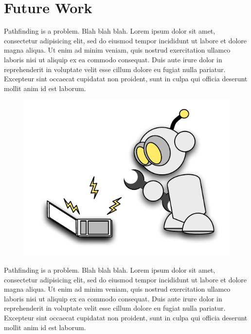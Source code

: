 \section{Future Work}
Pathfinding is a problem. Blah blah blah.
Lorem ipsum dolor sit amet, consectetur adipisicing elit, sed do eiusmod
tempor incididunt ut labore et dolore magna aliqua. Ut enim ad minim
veniam, quis nostrud exercitation ullamco laboris nisi ut aliquip ex ea
commodo consequat. Duis aute irure dolor in reprehenderit in voluptate
velit esse cillum dolore eu fugiat nulla pariatur. Excepteur sint occaecat
cupidatat non proident, sunt in culpa qui officia deserunt mollit anim
id est laborum.

 \begin{figure}
		\includegraphics[width=0.35\columnwidth, trim = 10mm 10mm 10mm
10mm]{diagrams/robot_mechanic.pdf}
 \end{figure}


Pathfinding is a problem. Blah blah blah.
Lorem ipsum dolor sit amet, consectetur adipisicing elit, sed do eiusmod
tempor incididunt ut labore et dolore magna aliqua. Ut enim ad minim
veniam, quis nostrud exercitation ullamco laboris nisi ut aliquip ex ea
commodo consequat. Duis aute irure dolor in reprehenderit in voluptate
velit esse cillum dolore eu fugiat nulla pariatur. Excepteur sint occaecat
cupidatat non proident, sunt in culpa qui officia deserunt mollit anim
id est laborum.
